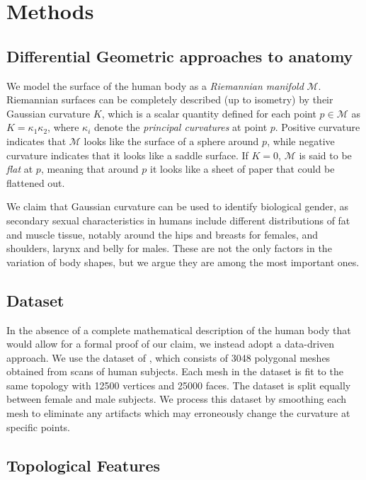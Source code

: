\documentclass[11pt]{article}
\begin{document}
\section{Methods}

\subsection{Differential Geometric approaches to anatomy}

We model the surface of the human body as a \textit{Riemannian manifold} $\mathcal{M}$. Riemannian surfaces can be completely described (up to isometry) by their Gaussian curvature $K$, which is a scalar quantity defined for each point $p \in \mathcal{M}$ as $K = \kappa_1 \kappa_2$, where $\kappa_i$ denote the \textit{principal curvatures} at point $p$. Positive curvature indicates that $\mathcal{M}$ looks like the surface of a sphere around $p$, while negative curvature indicates that it looks like a saddle surface. If $K=0$, $\mathcal{M}$ is said to be \textit{flat} at $p$, meaning that around $p$ it looks like a sheet of paper that could be flattened out.

We claim that Gaussian curvature can be used to identify biological gender, as secondary sexual characteristics in humans include different distributions of fat and muscle tissue, notably around the hips and breasts for females, and shoulders, larynx and belly for males. These are not the only factors in the variation of body shapes, but we argue they are among the most important ones.

\subsection{Dataset}

In the absence of a complete mathematical description of the human body that would allow for a formal proof of our claim, we instead adopt a data-driven approach. We use the dataset of \cite{Yang2014}, which consists of 3048 polygonal meshes obtained from scans of human subjects. Each mesh in the dataset is fit to the same topology with 12500 vertices and 25000 faces. The dataset is split equally between female and male subjects. We process this dataset by smoothing each mesh to eliminate any artifacts which may erroneously change the curvature at specific points.

\subsection{Topological Features}
\end{document}
